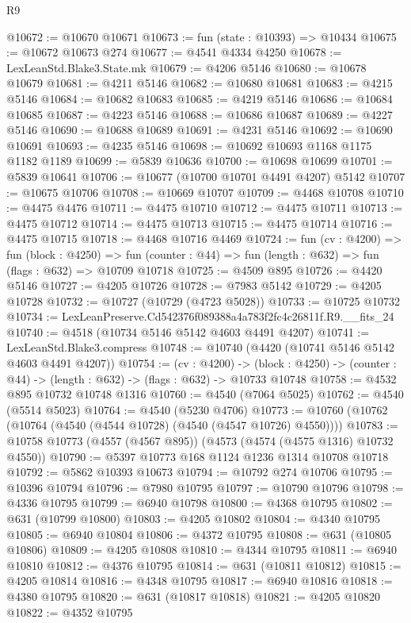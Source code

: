 \begin{lexlean}{R9}
\begin{coremodule}
@10672 := @10670 @10671
@10673 := fun (state : @10393) => @10434
@10675 := @10672 @10673 @274
@10677 := @4541 @4334 @4250
@10678 := LexLeanStd.Blake3.State.mk
@10679 := @4206 @5146
@10680 := @10678 @10679
@10681 := @4211 @5146
@10682 := @10680 @10681
@10683 := @4215 @5146
@10684 := @10682 @10683
@10685 := @4219 @5146
@10686 := @10684 @10685
@10687 := @4223 @5146
@10688 := @10686 @10687
@10689 := @4227 @5146
@10690 := @10688 @10689
@10691 := @4231 @5146
@10692 := @10690 @10691
@10693 := @4235 @5146
@10698 := @10692 @10693 @1168 @1175 @1182 @1189
@10699 := @5839 @10636
@10700 := @10698 @10699
@10701 := @5839 @10641
@10706 := @10677 (@10700 @10701 @4491 @4207) @5142
@10707 := @10675 @10706
@10708 := @10669 @10707
@10709 := @4468 @10708
@10710 := @4475 @4476
@10711 := @4475 @10710
@10712 := @4475 @10711
@10713 := @4475 @10712
@10714 := @4475 @10713
@10715 := @4475 @10714
@10716 := @4475 @10715
@10718 := @4468 @10716 @4469
@10724 := fun (cv : @4200) =>
  fun (block : @4250) =>
  fun (counter : @44) => fun (length : @632) => fun (flags : @632) => @10709 @10718
@10725 := @4509 @895
@10726 := @4420 @5146
@10727 := @4205 @10726
@10728 := @7983 @5142
@10729 := @4205 @10728
@10732 := @10727 (@10729 (@4723 @5028))
@10733 := @10725 @10732
@10734 := LexLeanPreserve.Cd542376f089388a4a783f2fc4c26811f.R9.__fits_24
@10740 := @4518 (@10734 @5146 @5142 @4603 @4491 @4207)
@10741 := LexLeanStd.Blake3.compress
@10748 := @10740 (@4420 (@10741 @5146 @5142 @4603 @4491 @4207))
@10754 := (cv : @4200) ->
  (block : @4250) -> (counter : @44) -> (length : @632) -> (flags : @632) -> @10733 @10748
@10758 := @4532 @895 @10732 @10748 @1316
@10760 := @4540 (@7064 @5025)
@10762 := @4540 (@5514 @5023)
@10764 := @4540 (@5230 @4706)
@10773 := @10760 (@10762 (@10764 (@4540 (@4544 @10728) (@4540 (@4547 @10726) @4550))))
@10783 := @10758 @10773 (@4557 (@4567 @895)) (@4573 (@4574 (@4575 @1316) @10732 @4550))
@10790 := @5397 @10773 @168 @1124 @1236 @1314 @10708 @10718
@10792 := @5862 @10393 @10673
@10794 := @10792 @274 @10706
@10795 := @10396 @10794
@10796 := @7980 @10795
@10797 := @10790 @10796
@10798 := @4336 @10795
@10799 := @6940 @10798
@10800 := @4368 @10795
@10802 := @631 (@10799 @10800)
@10803 := @4205 @10802
@10804 := @4340 @10795
@10805 := @6940 @10804
@10806 := @4372 @10795
@10808 := @631 (@10805 @10806)
@10809 := @4205 @10808
@10810 := @4344 @10795
@10811 := @6940 @10810
@10812 := @4376 @10795
@10814 := @631 (@10811 @10812)
@10815 := @4205 @10814
@10816 := @4348 @10795
@10817 := @6940 @10816
@10818 := @4380 @10795
@10820 := @631 (@10817 @10818)
@10821 := @4205 @10820
@10822 := @4352 @10795

\end{coremodule}
\end{lexlean}
